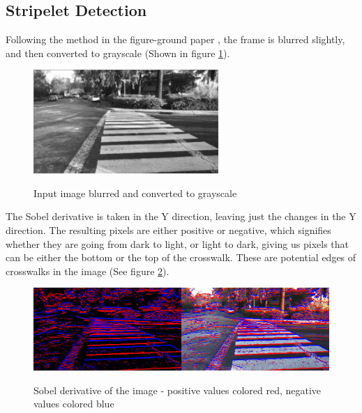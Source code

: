 \documentclass[12pt]{ucthesis}
\newcommand{\captionfonts}{\small\bf\ssp}
\begin{document}
\subsection{Stripelet Detection}

Following the method in the figure-ground paper \cite{Coughlan2006}, the frame is blurred slightly, and then converted to grayscale (Shown in figure \ref{fig:SlightlyBlurred}). 

\begin{figure}[t]
\begin{center}
\includegraphics[width=7cm]{SlightlyBlurredInput.png}
\captionfonts
\caption[Grayscale Image]{Input image blurred and converted to grayscale}
\label{fig:SlightlyBlurred}
\end{center}
\end{figure}

The Sobel derivative is taken in the Y direction, leaving just the changes in the Y direction. The resulting pixels are either positive or negative, which signifies whether they are going from dark to light, or light to dark, giving us pixels that can be either the bottom or the top of the crosswalk. These are potential edges of crosswalks in the image (See figure \ref{fig:TopAndBottomSobel}). 

\begin{figure}[t]
\begin{center}
\includegraphics[width=14cm]{TopAndBottomSobel.png}
\captionfonts
\caption[Sobel Derivative of Crosswalk Image]{Sobel derivative of the image - positive values colored red, negative values colored blue}
\label{fig:TopAndBottomSobel}
\end{center}
\end{figure}
\end{document}
